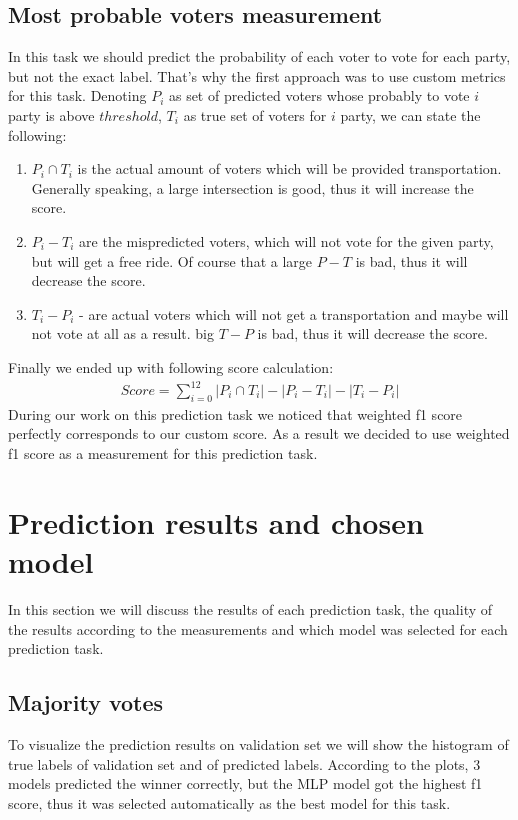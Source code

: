 \documentclass[12pt]{article}
\begin{document}
\subsection{Most probable voters measurement}
In this task we should predict the probability of each voter to vote for each party, but not the exact label. That's why the first approach was to use custom metrics for this task. Denoting $P_i$ as set of predicted voters whose probably to vote $i$ party is above $threshold$, $T_i$ as true set of voters for $i$ party, we can state the following:
\begin{enumerate}
	\item $P_i \cap T_i$ is the actual amount of voters which will be provided transportation. Generally speaking, a large intersection is good, thus it will increase the score.
	\item $P_i - T_i$ are the mispredicted voters, which will not vote for the given party, but will get a free ride. Of course that a large $P-T$ is bad, thus it will decrease the score.
	\item $T_i - P_i$ - are actual voters which will not get a transportation and maybe will not vote at all as a result. big $T-P$ is bad, thus it will decrease the score.
\end{enumerate} 
Finally we ended up with following score calculation:\\
\begin{gather*}   
   Score = \sum_{i=0}^{12} |P_i \cap T_i|-|P_i - T_i|-|T_i -P_i|  
\end{gather*}
During our work on this prediction task we noticed that weighted f1 score perfectly corresponds to our custom score. As a result we decided to use weighted f1 score as a measurement for this prediction task. 


\section{Prediction results and chosen model}
In this section we will discuss the results of each prediction task, the quality of the results according to the measurements and which model was selected for each prediction task.
\subsection{Majority votes}
To visualize the prediction results on validation set we will show the histogram of true labels of validation set and of predicted labels. According to the plots, 3 models predicted the winner correctly, but the MLP model got the highest f1 score, thus it was selected automatically as the best model for this task.
\end{document}

